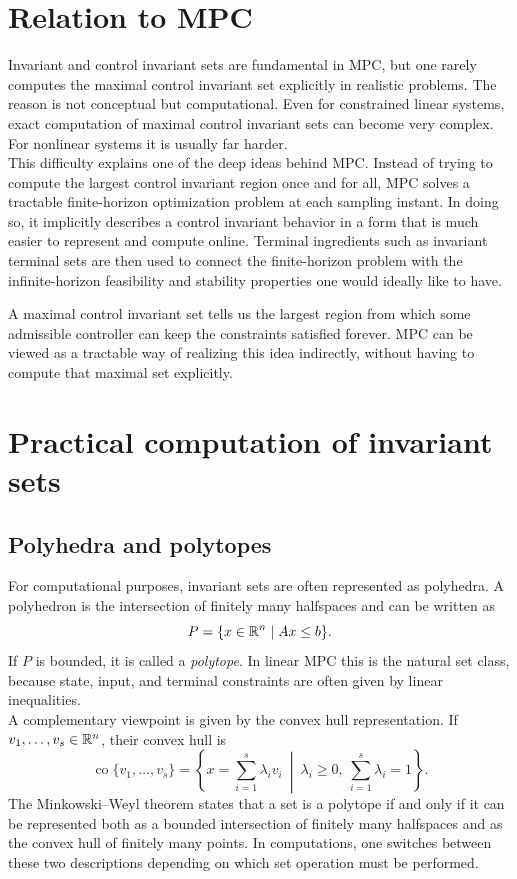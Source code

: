 \section{Relation to MPC}

Invariant and control invariant sets are fundamental in MPC, but one rarely computes the maximal
control invariant set explicitly in realistic problems. The reason is not conceptual but computational.
Even for constrained linear systems, exact computation of maximal control invariant sets can become
very complex. For nonlinear systems it is usually far harder.\\

This difficulty explains one of the deep ideas behind MPC. Instead of trying to compute the largest
control invariant region once and for all, MPC solves a tractable finite-horizon optimization problem
at each sampling instant. In doing so, it implicitly describes a control invariant behavior in a form
that is much easier to represent and compute online. Terminal ingredients such as invariant terminal
sets are then used to connect the finite-horizon problem with the infinite-horizon feasibility and
stability properties one would ideally like to have.

\begin{theorembox}
A maximal control invariant set tells us the largest region from which some admissible controller can
keep the constraints satisfied forever. MPC can be viewed as a tractable way of realizing this idea
indirectly, without having to compute that maximal set explicitly.
\end{theorembox}

\section{Practical computation of invariant sets}

\subsection{Polyhedra and polytopes}

For computational purposes, invariant sets are often represented as polyhedra. A polyhedron is the
intersection of finitely many halfspaces and can be written as
\[
P=\{x\in \mathbb{R}^n \mid Ax\leq b\}.
\]
If \(P\) is bounded, it is called a \emph{polytope}. In linear MPC this is the natural set class,
because state, input, and terminal constraints are often given by linear inequalities.\\
A complementary viewpoint is given by the convex hull representation. If \(v_1,\dots,v_s\in \mathbb{R}^n\),
their convex hull is
\[
\operatorname{co}\{v_1,\dots,v_s\}
=
\left\{
x=\sum_{i=1}^s \lambda_i v_i
\ \middle|\
\lambda_i\geq 0,\ \sum_{i=1}^s \lambda_i=1
\right\}.
\]
The Minkowski--Weyl theorem states that a set is a polytope if and only if it can be represented
both as a bounded intersection of finitely many halfspaces and as the convex hull of finitely many
points. In computations, one switches between these two descriptions depending on which set
operation must be performed.


